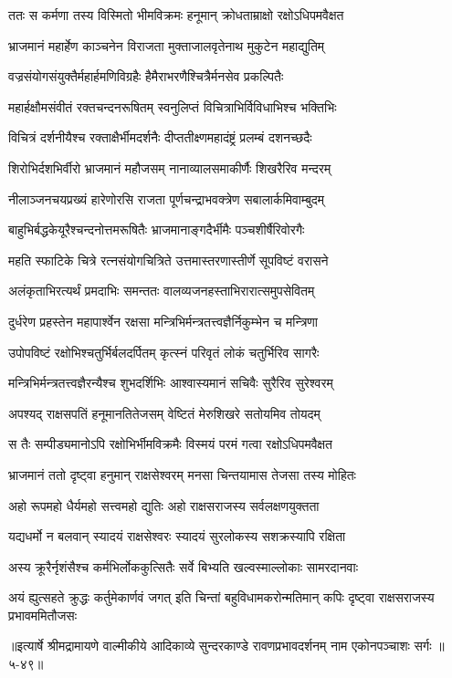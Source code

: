 
\twolineshloka
{ततः स कर्मणा तस्य विस्मितो भीमविक्रमः}
{हनूमान् क्रोधताम्राक्षो रक्षोऽधिपमवैक्षत} %

\twolineshloka
{भ्राजमानं महार्हेण काञ्चनेन विराजता}
{मुक्ताजालवृतेनाथ मुकुटेन महाद्युतिम्} %

\twolineshloka
{वज्रसंयोगसंयुक्तैर्महार्हमणिविग्रहैः}
{हैमैराभरणैश्चित्रैर्मनसेव प्रकल्पितैः} %

\twolineshloka
{महार्हक्षौमसंवीतं रक्तचन्दनरूषितम्}
{स्वनुलिप्तं विचित्राभिर्विविधाभिश्च भक्तिभिः} %

\twolineshloka
{विचित्रं दर्शनीयैश्च रक्ताक्षैर्भीमदर्शनैः}
{दीप्ततीक्ष्णमहादंष्ट्रं प्रलम्बं दशनच्छदैः} %

\twolineshloka
{शिरोभिर्दशभिर्वीरो भ्राजमानं महौजसम्}
{नानाव्यालसमाकीर्णैः शिखरैरिव मन्दरम्} %

\twolineshloka
{नीलाञ्जनचयप्रख्यं हारेणोरसि राजता}
{पूर्णचन्द्राभवक्त्रेण सबालार्कमिवाम्बुदम्} %

\twolineshloka
{बाहुभिर्बद्धकेयूरैश्चन्दनोत्तमरूषितैः}
{भ्राजमानाङ्गदैर्भीमैः पञ्चशीर्षैरिवोरगैः} %

\twolineshloka
{महति स्फाटिके चित्रे रत्नसंयोगचित्रिते}
{उत्तमास्तरणास्तीर्णे सूपविष्टं वरासने} %

\twolineshloka
{अलंकृताभिरत्यर्थं प्रमदाभिः समन्ततः}
{वालव्यजनहस्ताभिरारात्समुपसेवितम्} %

\twolineshloka
{दुर्धरेण प्रहस्तेन महापार्श्वेन रक्षसा}
{मन्त्रिभिर्मन्त्रतत्त्वज्ञैर्निकुम्भेन च मन्त्रिणा} %

\twolineshloka
{उपोपविष्टं रक्षोभिश्चतुर्भिर्बलदर्पितम्}
{कृत्स्नं परिवृतं लोकं चतुर्भिरिव सागरैः} %

\twolineshloka
{मन्त्रिभिर्मन्त्रतत्त्वज्ञैरन्यैश्च शुभदर्शिभिः}
{आश्वास्यमानं सचिवैः सुरैरिव सुरेश्वरम्} %

\twolineshloka
{अपश्यद् राक्षसपतिं हनूमानतितेजसम्}
{वेष्टितं मेरुशिखरे सतोयमिव तोयदम्} %

\twolineshloka
{स तैः सम्पीड्यमानोऽपि रक्षोभिर्भीमविक्रमैः}
{विस्मयं परमं गत्वा रक्षोऽधिपमवैक्षत} %

\twolineshloka
{भ्राजमानं ततो दृष्ट्वा हनुमान् राक्षसेश्वरम्}
{मनसा चिन्तयामास तेजसा तस्य मोहितः} %

\twolineshloka
{अहो रूपमहो धैर्यमहो सत्त्वमहो द्युतिः}
{अहो राक्षसराजस्य सर्वलक्षणयुक्तता} %

\twolineshloka
{यद्यधर्मो न बलवान् स्यादयं राक्षसेश्वरः}
{स्यादयं सुरलोकस्य सशक्रस्यापि रक्षिता} %

\twolineshloka
{अस्य क्रूरैर्नृशंसैश्च कर्मभिर्लोककुत्सितैः}
{सर्वे बिभ्यति खल्वस्माल्लोकाः सामरदानवाः} %

\threelineshloka
{अयं ह्युत्सहते क्रुद्धः कर्तुमेकार्णवं जगत्}
{इति चिन्तां बहुविधामकरोन्मतिमान् कपिः}
{दृष्ट्वा राक्षसराजस्य प्रभावममितौजसः} %


॥इत्यार्षे श्रीमद्रामायणे वाल्मीकीये आदिकाव्ये सुन्दरकाण्डे रावणप्रभावदर्शनम् नाम एकोनपञ्चाशः सर्गः ॥५-४९॥
